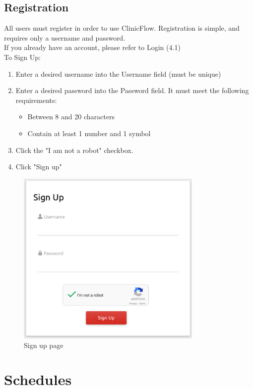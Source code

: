\documentclass[12pt]{article}
\begin{document}
\subsection{Registration}
All users must register in order to use ClinicFlow. Registration is simple, and requires only a username and password. \\
If you already have an account, please refer to Login (4.1) \\
To Sign Up:
\begin{enumerate}
\item Enter a desired username into the Username field (must be unique)
\item Enter a desired password into the Password field. It must meet the following requirements:
\begin{itemize}
	\item Between 8 and 20 characters
	\item Contain at least 1 number and 1 symbol
\end{itemize}
\item Click the "I am not a robot" checkbox.
\item Click "Sign up"
\end{enumerate}

\begin{figure}[H]
\centering
\includegraphics[width=0.8\textwidth]{signup}
\caption{Sign up page}
\end{figure}

\section{Schedules}
\end{document}
